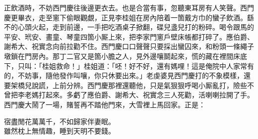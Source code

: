 正飲酒時，不妨西門慶往後邊更衣去。也是合當有事，忽聽東耳房有人笑聲。西門慶更畢衣，走至窻下偷眼觀覷，正見李桂姐在房內陪着一箇戴方巾的蠻子飲酒。{}繇不的心頭火起，走到前邊，一手把吃酒桌子掀翻，碟兒盞兒打的粉碎。喝令跟馬的平安、玳安、畫童、琴童四箇小厮上來，把李家門窻戶壁床帳都打碎了。應伯爵、謝希大、祝實念向前拉勸不住。西門慶口口聲聲只要採出蠻囚來，和粉頭一條繩子墩鎖在門房內。那丁二官又是箇小膽之人，見外邊嚷鬬起來，慌的藏在裡間床底下，只叫：「桂姐救命！」桂姐道：「呸！好不好，還有媽哩！這是俺院中人家常有的，不妨事，隨他發作叫嚷，你只休要出來。」老虔婆見西門慶打的不象模樣，還要架橋兒說謊，上前分辨。西門慶那裡還聽他，只是氣狠狠呼喝小厮亂打，險些不曾把李老媽打起來。多虧了應伯爵、謝希大、祝實念三人死勸，活喇喇拉開了手。西門慶大鬧了一場，賭誓再不踏他門來，大雪裡上馬回家。正是：

\begin{myquote} 
宿盡閒花萬萬千，不如歸家伴妻眠。\\雖然枕上無情趣，睡到天明不要錢。
\end{myquote} 

